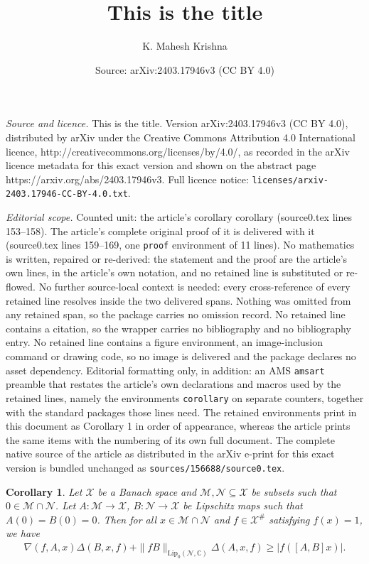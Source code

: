 \documentclass[10pt,a4paper]{amsart}
\title{This is the title}
\author{K. Mahesh Krishna}
\date{Source: arXiv:2403.17946v3 (CC BY 4.0)}
\newtheorem{corollary}{Corollary}
\begin{document}
\maketitle

\noindent\emph{Source and licence.} This is the title. Version arXiv:2403.17946v3 (CC BY 4.0), distributed by arXiv under the Creative Commons Attribution 4.0 International licence, http://creativecommons.org/licenses/by/4.0/, as recorded in the arXiv licence metadata for this exact version and shown on the abstract page https://arxiv.org/abs/2403.17946v3. Full licence notice: \texttt{licenses/arxiv-2403.17946-CC-BY-4.0.txt}.\par\smallskip

\noindent\textit{Editorial scope.} Counted unit: the article's corollary corollary (source0.tex lines 153--158). The article's complete original proof of it is delivered with it (source0.tex lines 159--169, one \texttt{proof} environment of 11 lines). No mathematics is written, repaired or re-derived: the statement and the proof are the article's own lines, in the article's own notation, and no retained line is substituted or re-flowed.  No further source-local context is needed: every cross-reference of every retained line resolves inside the two delivered spans.  Nothing was omitted from any retained span, so the package carries no omission record.  No retained line contains a citation, so the wrapper carries no bibliography and no bibliography entry.  No retained line contains a figure environment, an image-inclusion command or drawing code, so no image is delivered and the package declares no asset dependency.  Editorial formatting only, in addition: an AMS \texttt{amsart} preamble that restates the article's own declarations and macros used by the retained lines, namely the environments \texttt{corollary} on separate counters, together with the standard packages those lines need.  The retained environments print in this document as Corollary 1 in order of appearance, whereas the article prints the same items with the numbering of its own full document.  The complete native source of the article as distributed in the arXiv e-print for this exact version is bundled unchanged as \texttt{sources/156688/source0.tex}.
\begin{corollary}
	Let  $\mathcal{X}$ be a Banach space and  $\mathcal{M}, \mathcal{N}\subseteq  \mathcal{X}$ be  subsets such that $0 \in \mathcal{M}\cap \mathcal{N}$. Let $A:\mathcal{M}\to  \mathcal{X}$, $B:\mathcal{N}\to  \mathcal{X}$ be  Lipschitz maps such that $A(0)=B(0)=0$.  Then  for all $x\in \mathcal{M}\cap \mathcal{N}$ and $f \in  \mathcal{X}^\# $ satisfying $f(x)=1$, we have 	
	\begin{align*}
		\nabla(f, A,x)\Delta (B, x, f)+\|fB\|_{\text{Lip}_0(\mathcal{N}, \mathbb{C})}\Delta (A, x, f)\geq |f([A,B]x)|.
	\end{align*}
\end{corollary}
\end{document}
